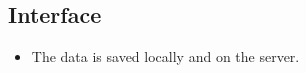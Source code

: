 \subsection*{Interface}
\begin{itemize}
	\item The data is saved locally and on the server.
\end{itemize}